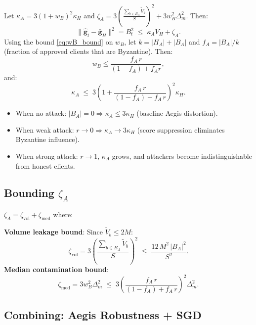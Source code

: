 \documentclass[../main]{subfiles}
\begin{document}
Let $\kappa_A = 3(1+w_B)^2\kappa_H$ and
$\zeta_A = 3\left(\frac{\sum_{b \in B_A}\widetilde{V}_b}{S}\right)^2 + 3 w_B^2\Delta_m^2$.
Then:
\begin{equation}
    \boxed{\|\hat{\mathbf{g}}_t - \bar{\mathbf{g}}_H\|^2 = B_t^2 \;\leq\; \kappa_A V_H + \zeta_A.}
    \label{eq:Bt_squared}
\end{equation}
Using the bound \eqref{eq:wB_bound} on $w_B$, let $k = |H_A| + |B_A|$ and
$f_A = |B_A|/k$ (fraction of approved clients that are Byzantine). Then:
\[
    w_B \leq \frac{f_A\, r}{(1-f_A) + f_A r},
\]
and:
\begin{equation}
    \kappa_A \;\leq\; 3\left(1 + \frac{f_A\,r}{(1-f_A) + f_A\,r}\right)^2 \kappa_H.
    \label{eq:kappaA_bound}
\end{equation}
\begin{remark}[Interpretation]
\begin{itemize}
    \item When no attack: $|B_A| = 0 \Rightarrow \kappa_A \leq 3\kappa_H$ (baseline Aegis distortion).
    \item When weak attack: $r \to 0 \Rightarrow \kappa_A \to 3\kappa_H$ (score suppression eliminates Byzantine influence).
    \item When strong attack: $r \to 1$, $\kappa_A$ grows, and attackers become indistinguishable from honest clients.
\end{itemize}
\end{remark}

\subsection{Bounding \texorpdfstring{$\zeta_A$}{zeta\_A}}

$\zeta_A = \zeta_{\text{vol}} + \zeta_{\text{med}}$ where:

\textbf{Volume leakage bound}: Since $\widetilde{V}_b \leq 2M$:
\begin{equation}
    \zeta_{\text{vol}} = 3\left(\frac{\sum_{b \in B_A}\widetilde{V}_b}{S}\right)^2
    \;\leq\; \frac{12\, M^2\, |B_A|^2}{S^2}.
    \label{eq:zeta_vol}
\end{equation}
\textbf{Median contamination bound}:
\begin{equation}
    \zeta_{\text{med}} = 3 w_B^2 \Delta_m^2
    \;\leq\; 3\left(\frac{f_A\,r}{(1-f_A) + f_A\,r}\right)^2 \Delta_m^2.
    \label{eq:zeta_med}
\end{equation}
\subsection{Combining: Aegis Robustness + SGD}
\end{document}

